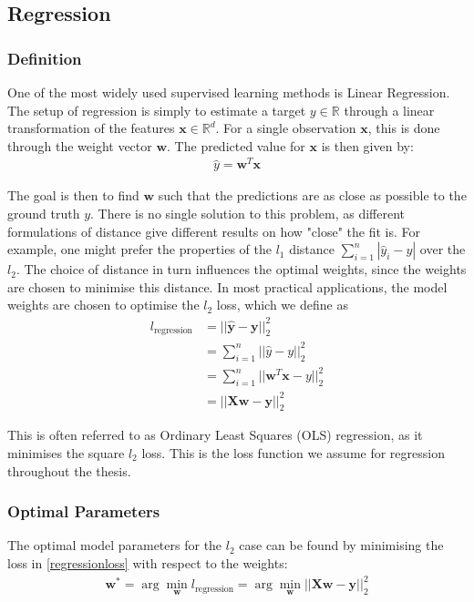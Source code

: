 \subsection{Regression}
\label{regression}
\subsubsection{Definition}
One of the most widely used supervised learning methods is Linear Regression. The setup of regression is simply to estimate a target $y \in \mathbb{R}$ through a linear transformation of the features $\mathbf{x} \in \mathbb{R}^{d}$. For a single observation $\mathbf{x}$, this is done through the weight vector $\mathbf{w}$. The predicted value for $\mathbf{x}$ is then given by:
\begin{align}
    \hat{y} = \mathbf{w}^T\mathbf{x}
\end{align}

The goal is then to find $\mathbf{w}$ such that the predictions are as close as possible to the ground truth $y$. There is no single solution to this problem, as different formulations of distance give different results on how "close" the fit is. For example, one might prefer the properties of the $l_1$ distance $\sum_{i=1}^n|\hat{y}_i - y|$ over the $l_2$. The choice of distance in turn influences the optimal weights, since the weights are chosen to minimise this distance. In most practical applications, the model weights are chosen to optimise the $l_2$ loss, which we define as
\begin{align}
    l_{\mathrm{regression}} &= ||\mathbf{\hat{y}} - \mathbf{y}||_2^2 \\
    &= \sum_{i=1}^n  ||\hat{y} - y||_2^2 \\
     &= \sum_{i=1}^n  ||\mathbf{w}^T\mathbf{x} - y||_2^2 \\
    &= ||\mathbf{X}\mathbf{w} - \mathbf{y}||_2^2 
    \label{regressionloss}
\end{align}

This is often referred to as Ordinary Least Squares (OLS) regression, as it minimises the square $l_2$ loss. This is the loss function we assume for regression throughout the thesis.


\subsubsection{Optimal Parameters}
The optimal model parameters for the $l_2$ case can be found by minimising the loss in \ref{regressionloss} with respect to the weights: 
\begin{align}
    \mathbf{w}^* = \arg \min_{\mathbf{w}}l_{\mathrm{regression}} = \arg \min_{\mathbf{w}} ||\mathbf{X}\mathbf{w} - \mathbf{y}||_2^2 
\end{align}

